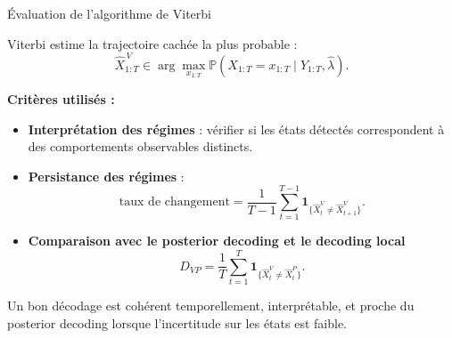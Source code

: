 \documentclass{beamer}
\begin{document}
\begin{frame}{Évaluation de l'algorithme de Viterbi}

\small

Viterbi estime la trajectoire cachée la plus probable :
\[
\widehat X_{1:T}^{\,V}
\in
\arg\max_{x_{1:T}}
\mathbb{P}(X_{1:T}=x_{1:T}\mid Y_{1:T},\widehat{\lambda}).
\]

\vspace{0.25cm}

\textbf{Critères utilisés :}

\begin{itemize}
    \item \textbf{Interprétation des régimes} : vérifier si les états détectés correspondent à des comportements observables distincts.

    \item \textbf{Persistance des régimes} :
    \[
    \text{taux de changement}
    =
    \frac{1}{T-1}
    \sum_{t=1}^{T-1}
    \mathbf{1}_{\{\widehat X_t^V\neq \widehat X_{t+1}^V\}}.
    \]

    \item \textbf{Comparaison avec le posterior decoding et le decoding local}
    \[
    D_{VP}
    =
    \frac{1}{T}
    \sum_{t=1}^{T}
    \mathbf{1}_{\{\widehat X_t^V\neq \widehat X_t^P\}}.
    \]
\end{itemize}

\vspace{0.1cm}

\scriptsize
Un bon décodage est cohérent temporellement, interprétable, et proche du posterior decoding lorsque l'incertitude sur les états est faible.

\end{frame}
\end{document}
